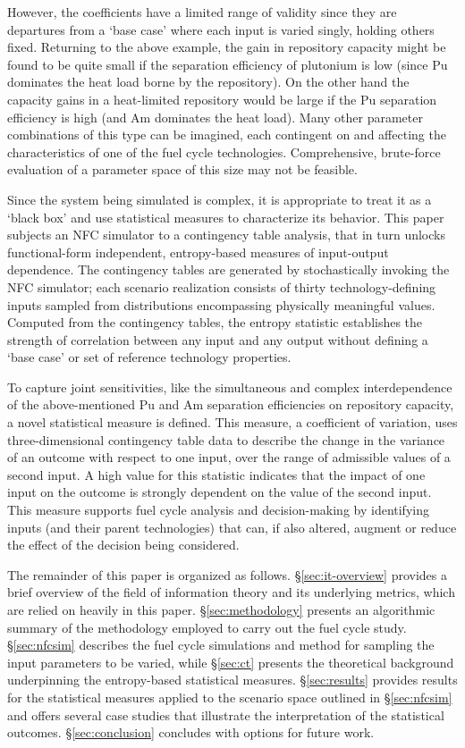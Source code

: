 \documentclass[a4paper, 12pt]{article}
\begin{document}
However, the coefficients have a limited range of validity since they are departures from a
`base case' where each input is varied singly, holding others fixed.  Returning to the above example,
the gain in repository capacity might be found to be quite small if the separation efficiency
of plutonium is low (since Pu dominates the heat load borne by the repository). 
On the other hand the capacity gains in a heat-limited repository would be large
if the Pu separation efficiency is high (and Am dominates the heat load).  Many other
parameter combinations of this type can be imagined, each contingent on and affecting 
the characteristics of one of the fuel cycle technologies.  Comprehensive,
brute-force evaluation of a parameter space of this size may not be feasible.

Since the system being simulated is complex, it is appropriate to treat it as a `black box'
and use statistical measures to characterize its behavior.  This paper subjects an NFC simulator
to a contingency table analysis, that in turn unlocks functional-form independent, entropy-based
measures of input-output dependence.  The contingency tables are generated by stochastically invoking
the NFC simulator; each scenario realization consists of thirty technology-defining inputs sampled
from distributions encompassing physically meaningful values.  Computed from the contingency tables,
the entropy statistic establishes the strength of correlation between any input and any output
without defining a `base case' or set of reference technology properties.

To capture joint sensitivities, like the simultaneous and complex interdependence of the
above-mentioned Pu and Am separation efficiencies on repository capacity, a novel statistical
measure is defined.  This measure, a coefficient of variation, uses three-dimensional contingency
table data to describe the change in the variance of an outcome with respect to one input, over the
range of admissible values of a second input.  A high value for this statistic indicates that the
impact of one input on the outcome is strongly dependent on the value of the second input.  This
measure supports fuel cycle analysis and decision-making by identifying inputs (and their
parent technologies) that can, if also altered, augment or reduce the effect of the decision
being considered.

The remainder of this paper is organized as follows.  \S \ref{sec:it-overview} provides a brief overview 
of the field of information theory and its underlying metrics, which are relied on heavily in this paper.
\S \ref{sec:methodology} presents an algorithmic summary of the
methodology employed to carry out the fuel cycle study.  \S \ref{sec:nfcsim} describes the fuel cycle 
simulations and method for sampling the input parameters to be varied, while \S \ref{sec:ct} 
presents the theoretical background underpinning the entropy-based
statistical measures.  \S \ref{sec:results} provides results for the statistical measures applied to the scenario
space outlined in \S \ref{sec:nfcsim} and offers several case studies that illustrate the interpretation
of the statistical outcomes.  \S \ref{sec:conclusion} concludes with options for future work.
\end{document}

